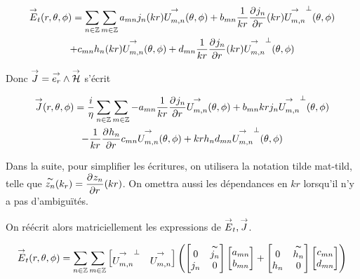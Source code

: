         \begin{multline}
            \vE_t(\rtp) = \sum_{n\in\ZZ}\sum_{m\in\ZZ} a_{mn} j_n(kr)\Umn(\tp) + b_{mn} \frac{1}{kr}\ddr{r}{j_n}(kr)\Umn^\perp(\tp)
            \\
            + c_{mn} h_n(kr)\Umn(\tp) + d_{mn} \frac{1}{kr}\ddr{r}{j_n}(kr)\Umn^\perp(\tp)
        \end{multline}


        Donc \(\vJ = \vect{e_r} \pvect \vH\) s'écrit

        \begin{multline}
            \vJ(\rtp) = \frac{i}{\eta}\sum_{n\in\ZZ}\sum_{m\in\ZZ} - a_{mn} \frac{1}{kr}\ddr{r}{j_n}\Umn(\tp) + b_{mn} k r j_n \Umn^\perp(\tp)
            \\
            -  \frac{1}{kr}\ddr{r}{h_n} c_{mn} \Umn(\tp) + k r h_n d_{mn} \Umn^\perp(\tp)
        \end{multline}

        Dans la suite, pour simplifier les écritures, on utilisera la notation tilde \gls{mat-tild}, telle que \( \tilde{z_n}(k_r) = \ddr{r}{z_n}(kr) \). On omettra aussi les dépendances en \(kr\) lorsqu'il n'y a pas d’ambiguïtés.

        On réécrit alors matriciellement les expressions de \(\vE_t,\vJ\).

        \begin{equation}
            \vE_t(\rtp) = \sum_{n\in\ZZ}\sum_{m\in\ZZ}
            \begin{bmatrix}
              \Umn^\perp & \Umn
            \end{bmatrix}
            \left( 
              \begin{bmatrix}
                  0 & \tilde{j_n}
                  \\
                  j_n & 0
              \end{bmatrix}
              \begin{bmatrix}
                  a_{mn}
                  \\
                  b_{mn}
              \end{bmatrix}
              + 
              \begin{bmatrix}
                  0 & \tilde{h_n}
                  \\
                  h_n & 0
              \end{bmatrix}
              \begin{bmatrix}
                  c_{mn}
                  \\
                  d_{mn}
              \end{bmatrix}
            \right)
        \end{equation}


